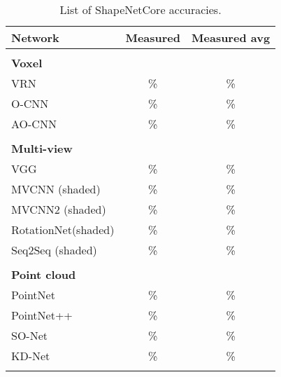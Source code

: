 \begin{table}[]
	\begin{tabular}{lcc}
		\hline
		\textbf{Network}       & Measured & Measured avg \\ \hline
		                       &          &              \\
		\textbf{Voxel }        &          &              \\
		VRN                    &    \%    &      \%      \\
		O-CNN                  &    \%    &      \%      \\
		AO-CNN                 &    \%    &      \%      \\
		                       &          &              \\
		\textbf{Multi-view }   &          &              \\
		VGG                    &    \%    &      \%      \\
		MVCNN (shaded)         &    \%    &      \%      \\
		MVCNN2 (shaded)        &    \%    &      \%      \\
		RotationNet(shaded)    &    \%    &      \%      \\
		Seq2Seq (shaded)       &    \%    &      \%      \\
		                       &          &              \\
		\textbf{Point cloud  } &          &              \\
		PointNet               &    \%    &      \%      \\
		PointNet++             &    \%    &      \%      \\
		SO-Net                 &    \%    &      \%      \\
		KD-Net                 &    \%    &      \%      \\
		                       &          &              \\ \hline
	\end{tabular}
\caption{List of ShapeNetCore accuracies.}
\label{Table:saccs}
\end{table}